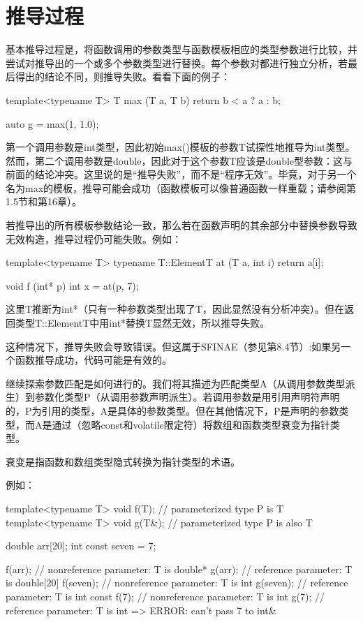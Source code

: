 \section{推导过程}
基本推导过程是，将函数调用的参数类型与函数模板相应的类型参数进行比较，并尝试对推导出的一个或多个参数类型进行替换。每个参数对都进行独立分析，若最后得出的结论不同，则推导失败。看看下面的例子：
 
\begin{cpp}
template<typename T>
T max (T a, T b)
{
	return b < a ? a : b;
}

auto g = max(1, 1.0);
\end{cpp} 
 
第一个调用参数是int类型，因此初始max()模板的参数T试探性地推导为int类型。然而，第二个调用参数是double，因此对于这个参数T应该是double型参数：这与前面的结论冲突。这里说的是“推导失败”，而不是“程序无效”。毕竟，对于另一个名为max的模板，推导可能会成功（函数模板可以像普通函数一样重载；请参阅第1.5节和第16章）。
 
若推导出的所有模板参数结论一致，那么若在函数声明的其余部分中替换参数导致无效构造，推导过程仍可能失败。例如：

\begin{cpp}
template<typename T>
typename T::ElementT at (T a, int i)
{
	return a[i];
}

void f (int* p)
{
	int x = at(p, 7);
}
\end{cpp} 

这里T推断为int*（只有一种参数类型出现了T，因此显然没有分析冲突）。但在返回类型T::ElementT中用int*替换T显然无效，所以推导失败。

\begin{notice}
这种情况下，推导失败会导致错误。但这属于SFINAE（参见第8.4节）:如果另一个函数推导成功，代码可能是有效的。
\end{notice}

继续探索参数匹配是如何进行的。我们将其描述为匹配类型A（从调用参数类型派生）到参数化类型P（从调用参数声明派生）。若调用参数是用引用声明符声明的，P为引用的类型，A是具体的参数类型。但在其他情况下，P是声明的参数类型，而A是通过（忽略const和volatile限定符）将数组和函数类型衰变为指针类型。

\begin{notice}
衰变是指函数和数组类型隐式转换为指针类型的术语。
\end{notice}

例如：

\begin{cpp}
template<typename T> void f(T); // parameterized type P is T
template<typename T> void g(T&); // parameterized type P is also T

double arr[20];
int const seven = 7;

f(arr); // nonreference parameter: T is double*
g(arr); // reference parameter: T is double[20]
f(seven); // nonreference parameter: T is int
g(seven); // reference parameter: T is int const
f(7); // nonreference parameter: T is int
g(7); // reference parameter: T is int => ERROR: can't pass 7 to int&
\end{cpp} 

